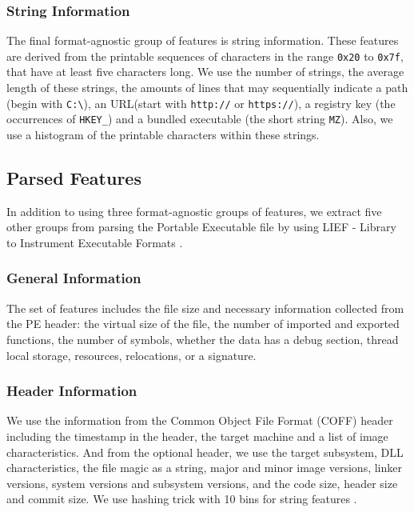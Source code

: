 \subsubsection{String Information}

The final format-agnostic group of features is string information. These features are derived from the printable sequences of characters in the range \verb|0x20| to \verb|0x7f|, that have at least five characters long. We use the number of strings, the average length of these strings, the amounts of lines  that may sequentially indicate a path (begin with \verb|C:\|), an URL(start with \verb|http://| or \verb|https://|), a registry key (the occurrences of \verb|HKEY_|) and a bundled executable (the short string \verb|MZ|). Also, we use a histogram of the printable characters within these strings.

\subsection{Parsed Features}

In addition to using three format-agnostic groups of features, we extract five other groups from parsing the Portable Executable file by using LIEF - Library to Instrument Executable Formats \cite{lief}.

\subsubsection{General Information}

The set of features includes the file size and necessary information collected from the PE header: the virtual size of the file, the number of imported and exported functions, the number of symbols, whether the data has a debug section, thread local storage, resources, relocations, or a signature.

\subsubsection{Header Information}

We use the information from the Common Object File Format (COFF) header including the timestamp in the header, the target machine and a list of image characteristics. And from the optional header, we use the target subsystem, DLL  characteristics,  the file magic as a string, major and minor image versions, linker versions, system versions and subsystem versions, and the code size, header size and commit size. We use hashing trick with 10 bins for string features \cite{weinberger2009feature}.

